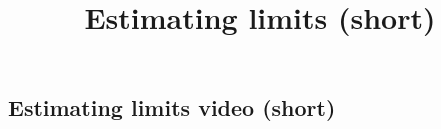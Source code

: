 \documentclass{ximera}
\title{Estimating limits (short)}
\begin{document}
\begin{abstract}
\end{abstract}

\maketitle

\subsection{Estimating limits video (short)}

\begin{center}
\end{center}
\end{document}
